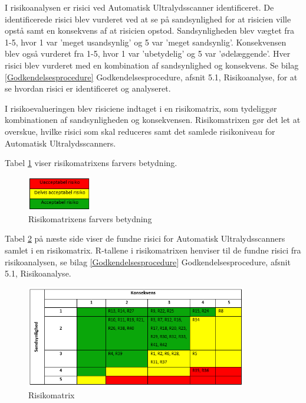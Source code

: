 I risikoanalysen er risici ved Automatisk Ultralydsscanner identificeret. De identificerede risici blev vurderet ved at se på sandsynlighed for at risicien ville opstå samt en konsekvens af at risicien opstod. Sandsynligheden blev vægtet fra 1-5, hvor 1 var 'meget usandsynlig' og 5 var 'meget sandsynlig'. Konsekvensen blev også vurderet fra 1-5, hvor 1 var 'ubetydelig' og 5 var 'ødelæggende'. Hver risici blev vurderet med en kombination af sandsynlighed og konsekvens. Se bilag \ref{Godkendelsesprocedure} Godkendelsesprocedure, afsnit 5.1, Risikoanalyse, for at se hvordan risici er identificeret og analyseret. 

I risikoevalueringen blev risiciene indtaget i en risikomatrix, som tydeliggør kombinationen af sandsynligheden og konsekvensen. Risikomatrixen gør det let at overskue, hvilke risici som skal reduceres samt det samlede risikoniveau for Automatisk Ultralydsscanners.  

Tabel \ref{Niveau} viser risikomatrixens farvers betydning. 

\begin{figure}[H]
    \centering
    \includegraphics[width=0.25\textwidth]{figurer/r/Niveau}
    \caption{Risikomatrixens farvers betydning}
    \label{Niveau}
\end{figure}

Tabel \ref{Risiko} på næste side viser de fundne risici for Automatisk Ultralydsscanners samlet i en risikomatrix. R-tallene i risikomatrixen henviser til de fundne risici fra risikoanalysen, se bilag \ref{Godkendelsesprocedure} Godkendelsesprocedure, afsnit 5.1, Risikoanalyse.  

\begin{figure}[H]
    \centering
    \includegraphics[width=0.86\textwidth]{figurer/r/Risiko}
    \caption{Risikomatrix}
    \label{Risiko}
\end{figure}

